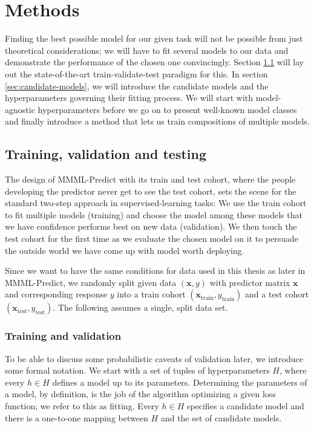 \chapter{Methods} \label{chap:methods}

Finding the best possible model for our given task will not be possible from just theoretical 
considerations; we will have to fit several models to our data and demonstrate the performance of 
the chosen one convincingly. Section \ref{sec:train-val-test} will lay out the state-of-the-art 
train-validate-test paradigm for this. In section \ref{sec:candidate-models}, we will introduce 
the candidate models and the hyperparameters governing their fitting process. We will start with 
model-agnostic hyperparameters before we go on to present well-known model classes and finally 
introduce a method that lets us train compositions of multiple models.

\section{Training, validation and testing}\label{sec:train-val-test}

The design of MMML-Predict with its train and test cohort, where the people developing the predictor 
never get to see the test cohort, sets the scene for the standard two-step approach in 
supervised-learning tasks: We use the train cohort to fit multiple models (training) and choose the model
among these models that we have confidence performs best on new data (validation). We then touch 
the test cohort for the first time as we evaluate the chosen model on it to persuade the outside 
world we have come up with model worth deploying.

Since we want to have the same conditions for data used in this thesis as later in MMML-Predict,
we randomly split given data $(\mathbf{x}, y)$ with predictor matrix $\mathbf{x}$ and corresponding 
response $y$ into a train cohort $(\mathbf{x}_\text{train}, y_\text{train})$ and a test cohort 
$(\mathbf{x}_\text{test}, y_\text{test})$. The following assumes a single, split data set.

\subsection{Training and validation}\label{subsec:train-val}

To be able to discuss some probabilistic caveats of validation later, we introduce some formal 
notation. We start with a set of tuples of hyperparameters $H$, where every $h \in H$ defines a model
up to its parameters. Determining the parameters of a model, by definition, is the job of the 
algorithm optimizing a given loss function; we refer to this as fitting. Every $h \in H$ specifies 
a candidate model and there is a one-to-one mapping between $H$ and the set of candidate models.

